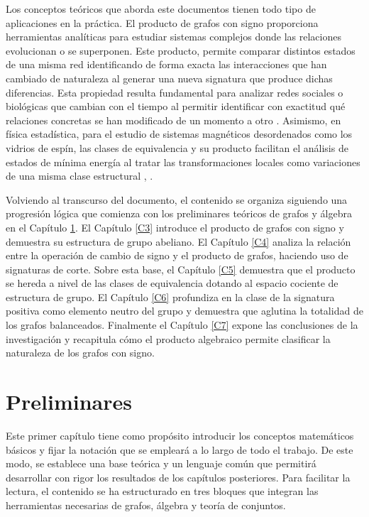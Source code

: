 \documentclass[11pt,a4paper,spanish]{report}
\theoremstyle{plain}
\begin{document}
Los conceptos teóricos que aborda este documentos tienen todo tipo de aplicaciones en la práctica. El producto de grafos con signo proporciona herramientas analíticas para estudiar sistemas complejos donde las relaciones evolucionan o se superponen. Este producto, permite comparar distintos estados de una misma red identificando de forma exacta las interacciones que han cambiado de naturaleza al generar una nueva signatura que produce dichas diferencias. Esta propiedad resulta fundamental para analizar redes sociales o biológicas que cambian con el tiempo al permitir identificar con exactitud qué relaciones concretas se han modificado de un momento a otro \cite{tang2016survey}. Asimismo, en física estadística, para el estudio de sistemas magnéticos desordenados como los vidrios de espín, las clases de equivalencia y su producto facilitan el análisis de estados de mínima energía al tratar las transformaciones locales como variaciones de una misma clase estructural \cite{barahona1982computational}, \cite{facchetti2011computing}.


Volviendo al transcurso del documento, el contenido se organiza siguiendo una progresión lógica que comienza con los preliminares teóricos de grafos y álgebra en el Capítulo \ref{C2}. El Capítulo \ref{C3} introduce el producto de grafos con signo y demuestra su estructura de grupo abeliano. El Capítulo \ref{C4} analiza la relación entre la operación de cambio de signo y el producto de grafos, haciendo uso de signaturas de corte.
Sobre esta base, el Capítulo \ref{C5} demuestra que el producto se hereda a nivel de las clases de equivalencia dotando al espacio cociente de estructura de grupo. El Capítulo \ref{C6} profundiza en la clase de la signatura positiva como elemento neutro del grupo y demuestra que aglutina la totalidad de los grafos balanceados. Finalmente el Capítulo \ref{C7} expone las conclusiones de la investigación y recapitula cómo el producto algebraico permite clasificar la naturaleza de los grafos con signo.

\chapter{Preliminares}\label{C2}
Este primer capítulo tiene como propósito introducir los conceptos matemáticos básicos y fijar la notación que se empleará a lo largo de todo el trabajo. De este modo, se establece una base teórica y un lenguaje común que permitirá desarrollar con rigor los resultados de los capítulos posteriores. Para facilitar la lectura, el contenido se ha estructurado en tres bloques que integran las herramientas necesarias de grafos, álgebra y teoría de conjuntos.
\end{document}
